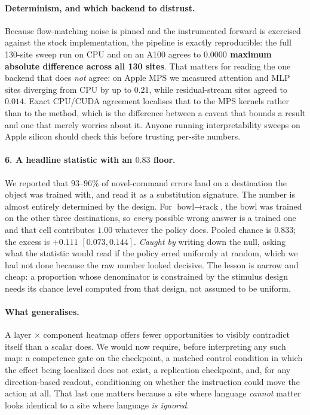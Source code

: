\documentclass{article}
\begin{document}
\paragraph{Determinism, and which backend to distrust.} Because flow-matching noise is pinned
and the instrumented forward is exercised against the stock implementation, the pipeline is
exactly reproducible: the full 130-site sweep run on CPU and on an A100 agrees to
\textbf{$0.0000$ maximum absolute difference across all 130 sites}. That matters for reading
the one backend that does \emph{not} agree: on Apple MPS we measured attention and MLP sites
diverging from CPU by up to $0.21$, while residual-stream sites agreed to $0.014$. Exact
CPU/CUDA agreement localises that to the MPS kernels rather than to the method, which is the
difference between a caveat that bounds a result and one that merely worries about it. Anyone
running interpretability sweeps on Apple silicon should check this before trusting per-site
numbers.

\paragraph{6. A headline statistic with an $0.83$ floor.} We reported that $93$--$96\%$ of
novel-command errors land on a destination the object was trained with, and read it as a
substitution signature. The number is almost entirely determined by the design. For
$\textrm{bowl} \to \textrm{rack}$, the bowl was trained on the other three destinations, so
\emph{every} possible wrong answer is a trained one and that cell contributes $1.00$ whatever
the policy does. Pooled chance is $0.833$; the excess is $+0.111$ $[0.073, 0.144]$.
\emph{Caught by} writing down the null, asking what the statistic would read if the policy
erred uniformly at random, which we had not done because the raw number looked decisive.
The lesson is narrow and cheap: a proportion whose denominator is constrained by the stimulus
design needs its chance level computed from that design, not assumed to be uniform.

\paragraph{What generalises.} A layer $\times$ component heatmap offers fewer opportunities to
visibly contradict itself than a scalar does. We would now require, before interpreting any such
map: a competence gate on the checkpoint, a matched control condition in which the effect being
localized does not exist, a replication checkpoint, and, for any direction-based
readout, conditioning on whether the instruction could move the action at all. That last one
matters because a site where language \emph{cannot} matter looks identical to a site where
language \emph{is ignored}.
\end{document}
